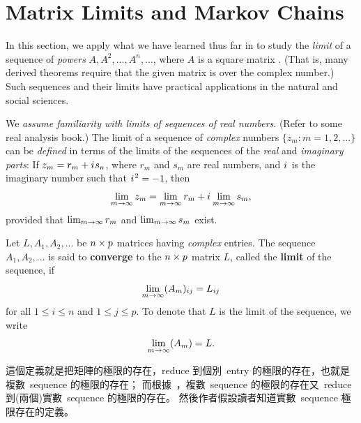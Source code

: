 \section{Matrix Limits and Markov Chains} \label{sec 5.3}


In this section, we apply what we have learned thus far in  to study the \emph{limit} of a sequence of \emph{powers} \(A, A^2, ..., A^n, ...\),
where \(A\) is a square matrix .
(That is, many derived theorems require that the given matrix is over the complex number.)
Such sequences and their limits have practical applications in the natural and social sciences.

\begin{additional definition} \label{adef 5.2}
We \emph{assume familiarity with limits of sequences of real numbers}.
(Refer to some real analysis book.)
The limit of a sequence of \emph{complex} numbers \(\{ z_m : m = 1, 2, ... \}\) can be \emph{defined} in terms of the limits of the sequences of the \emph{real} and \emph{imaginary parts}:
If \(z_m = r_m + {i\mkern1mu} s_n\), where \(r_m\) and \(s_m\) are real numbers, and \({i\mkern1mu}\) is the imaginary number such that \({i\mkern1mu}^2 = -1\), then
\[
    \lim_{m \to \infty} z_m = \lim_{m \to \infty} r_m + {i\mkern1mu} \lim_{m \to \infty} s_m, 
\]
provided that \(\lim_{m \to \infty} r_m\) and \(\lim_{m \to \infty} s_m\) exist.
\end{additional definition}

\begin{definition} \label{def 5.10}
Let \(L, A_1, A_2, ...\) be \(n \times p\) matrices having \emph{complex} entries.
The sequence \(A_1, A_2, ...\) is said to \textbf{converge} to the \(n \times p\) matrix \(L\), called the \textbf{limit} of the sequence, if
\[
    \lim_{m \to \infty} (A_m)_{ij} = L_{ij}
\]
for all \(1 \le i \le n\) and \(1 \le j \le p\).
To denote that \(L\) is the limit of the sequence, we write
\[
    \lim_{m \to \infty} (A_m) = L.
\]
\end{definition}

\begin{note}
這個定義就是把矩陣的極限的存在，reduce 到個別\ entry 的極限的存在，也就是複數\ sequence 的極限的存在；
而根據\ ，複數\ sequence 的極限的存在又\ reduce 到(兩個)實數\ sequence 的極限的存在。
然後作者假設讀者知道實數\ sequence 極限存在的定義。
\end{note}

